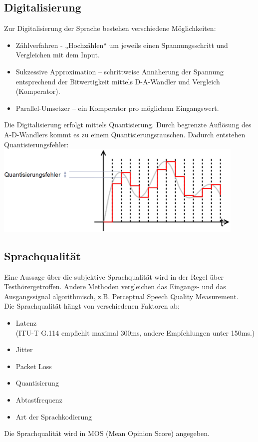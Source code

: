 \documentclass{article} %
\begin{document}
\subsection{Digitalisierung}
Zur Digitalisierung der Sprache bestehen verschiedene Möglichkeiten:
\begin{itemize}
	\item Zählverfahren - „Hochzählen“ um jeweils einen Spannungsschritt und Vergleichen mit dem Input.
	\item Sukzessive Approximation – schrittweise Annäherung der Spannung entsprechend der Bitwertigkeit mittels D-A-Wandler	und Vergleich (Komperator).
	\item Parallel-Umsetzer – ein Komperator pro möglichem	Eingangswert.	
\end{itemize}
Die Digitalisierung erfolgt mittels Quantisierung. Durch begrenzte Auflösung des A-D-Wandlers kommt es zu einem Quantisierungsrauschen. Dadurch entstehen Quantisierungsfehler:\\
\includegraphics[width=12cm]{img/quantisierungsfehler.png}
\subsection{Sprachqualität}
Eine Aussage über die subjektive Sprachqualität wird in der Regel über \glqq Testhörer\grqq getroffen. Andere Methoden vergleichen das Eingangs- und das Ausgangssignal algorithmisch, z.B. Perceptual Speech Quality Measurement.\\
Die Sprachqualität hängt von verschiedenen Faktoren ab:
\begin{itemize}
	\item Latenz\\
	(ITU-T G.114 empfiehlt maximal 300ms, andere Empfehlungen unter 150ms.)
	\item Jitter
	\item Packet Loss
	\item Quantisierung
	\item Abtastfrequenz
	\item Art der Sprachkodierung
\end{itemize}
Die Sprachqualität wird in MOS (Mean Opinion Score) angegeben.
\end{document}
